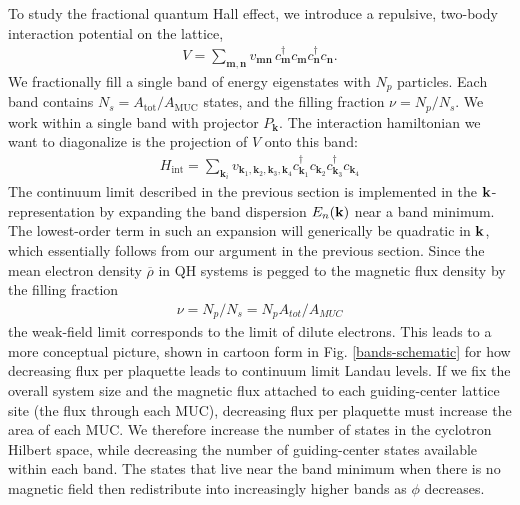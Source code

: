 \documentclass[aps,prb,twocolumn,letterpaper,twoside,nobalancelastpage,groupedaddress,amsmath,amssymb,floatfix,citeautoscript]{revtex4-1}
\begin{document}
To study the fractional quantum Hall effect, we introduce a repulsive, two-body interaction potential on the lattice,
\begin{align*}
V = \sum_{\mathbf{m},\mathbf{n}}v_{\mathbf{m}\mathbf{n}}\, c^{\dag}_\mathbf{m} c_\mathbf{m} c^{\dag}_\mathbf{n} c_\mathbf{n}.
\end{align*}
We fractionally fill a single band of energy eigenstates with $N_p$ particles. Each band contains $N_s = A_{\text{tot}}/A_{\text{MUC}}$ states, and the filling fraction $\nu = N_p /N_s$. We work within a single band with projector $P_{\mathbf{k}}$. The interaction hamiltonian we want to diagonalize is the projection of $V$ onto this band:
\begin{align*}
H_{\text{int}} = \sum_{{\mathbf{k}_i}} v_{\mathbf{k}_1,\mathbf{k}_2,\mathbf{k}_3,\mathbf{k}_4}c^{\dag}_{\mathbf{k}_1} c_{\mathbf{k}_2} c^{\dag}_{\mathbf{k}_3} c_{\mathbf{k}_4}
\end{align*}
The continuum limit described in the previous section is implemented in the ${\bf k}$-representation by expanding the band dispersion $E_{n}({\bf k})$ near a band minimum. The lowest-order term in such an expansion will generically be quadratic in ${\bf k}$, which essentially follows from our argument in the previous section. Since the mean electron density $\overline{\rho}$ in QH systems is pegged to the magnetic flux density by the filling fraction
\begin{align*}
\nu = N_p/N_s = N_p A_{tot}/A_{MUC}
\end{align*}
the weak-field limit corresponds to the limit of dilute electrons. This leads to a more conceptual picture, shown in cartoon form in Fig. \ref{bands-schematic} for how decreasing flux per plaquette leads to continuum limit Landau levels. If we fix the overall system size and the magnetic flux attached to each guiding-center lattice site (the flux through each MUC), decreasing flux per plaquette must increase the area of each MUC. We therefore increase the number of states in the cyclotron Hilbert space, while decreasing the number of guiding-center states available within each band. The states that live near the band minimum when there is no magnetic field then redistribute into increasingly higher bands as $\phi$ decreases.
\end{document}
